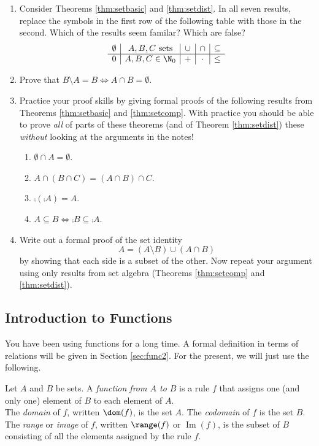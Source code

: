 \begin{enumerate}
	\item Consider Theorems \ref{thm:setbasic} and \ref{thm:setdist}. In all seven results, replace the symbols in the first row of the following table with those in the second. Which of the results seem familar? Which are false?
\[\begin{array}{c|c|c|c|c}
\emptyset&A,B,C\text{ sets}&\cup&\cap&\subseteq\\\hline
0&A,B,C\in\N_0&+&\cdot&\le
\end{array}\]

	\item Prove that $B\setminus A=B\iff A\cap B=\emptyset$.
	
	\item Practice your proof skills by giving formal proofs of the following results from Theorems \ref{thm:setbasic} and \ref{thm:setcomp}. With practice you should be able to prove \emph{all} of parts of these theorems (and of Theorem \ref{thm:setdist}) these \emph{without} looking at the arguments in the notes!
	\begin{enumerate}
	  \item $\emptyset\cap A=\emptyset$.
		\item $A\cap (B\cap C)=(A\cap B)\cap C$.
		\item $\comp{(\comp A)}=A$.
		\item $A\subseteq B\iff \comp B\subseteq \comp A$.
	\end{enumerate}

	\item Write out a formal proof of the set identity
	\[A=(A\setminus B)\cup (A\cap B)\]
	by showing that each side is a subset of the other. Now repeat your argument using only results from set algebra (Theorems \ref{thm:setcomp} and \ref{thm:setdist}).
\end{enumerate}
\newpage


\subsection{Introduction to Functions}\label{sec:func1}

You have been using functions for a long time. A formal definition in terms of relations will be given in Section \ref{sec:func2}. For the present, we will just use the following.

\begin{defn}
Let $A$ and $B$ be sets. A \emph{function from $A$ to $B$} is a rule $f$ that assigns one (and only one) element of $B$ to each element of $A$.\\
The \emph{domain} of $f$, written $\dom(f)$, is the set $A$. The \emph{codomain} of $f$ is the set $B$.\\
The \emph{range} or \emph{image} of $f$, written $\range(f)$ or $\operatorname{Im}(f)$, is the subset of $B$ consisting of all the elements assigned by the rule $f$.
\end{defn}

